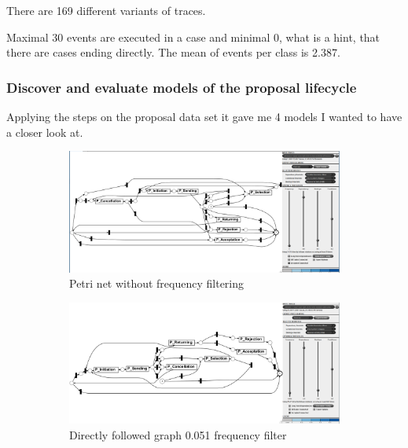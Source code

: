 There are 169 different variants of traces.

Maximal 30 events are executed in a case and minimal 0, what is a hint, that there are cases ending directly. The mean of events per class is 2.387.


\subsubsection{Discover and evaluate models of the proposal lifecycle}

Applying the steps on the proposal data set it gave me 4 models I wanted to have a closer look at.

\begin{figure}[!htbp]
\centering
\begin{subfigure}{.4\textwidth}
  \centering
  \includegraphics[width=\linewidth]{P_DirectlyFollowedFreq0.PNG}
  \caption{Petri net without frequency filtering}
  \label{fig:P_DFG0}
\end{subfigure}%
\begin{subfigure}{.4\textwidth}
  \centering
  \includegraphics[width=\linewidth]{P_DirectlyFollowedFreq0-051.PNG}
  \caption{Directly followed graph 0.051 frequency filter}
  \label{fig:P_DFG0-051}
\end{subfigure}
\begin{subfigure}{.4\textwidth}
  \centering

\end{subfigure}
\end{figure}
